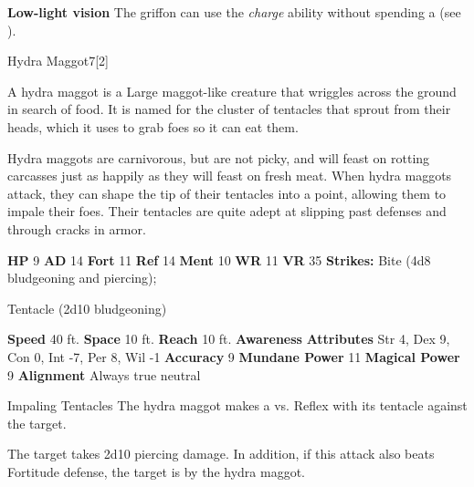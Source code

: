       
      \par\noindent\textbf{Low-light vision}
      The griffon can use the \textit{charge} ability without spending a  (see ).
  
  \begin{monsection}{Hydra Maggot}{7}[2]
    \vspace{-1em}\vspace{-1em}
    \vspace{0em}

    
        A hydra maggot is a Large maggot-like creature that wriggles across the ground in search of food.
        It is named for the cluster of tentacles that sprout from their heads, which it uses to grab foes so it can eat them.
      
        Hydra maggots are carnivorous, but are not picky, and will feast on rotting carcasses just as happily as they will feast on fresh meat.
        When hydra maggots attack, they can shape the tip of their tentacles into a point, allowing them to impale their foes.
        Their tentacles are quite adept at slipping past defenses and through cracks in armor.
      

    \begin{spellcontent}
      \begin{spelltargetinginfo}
        \pari \textbf{HP} 9 \monsep
          \textbf{AD} 14 \monsep
          \textbf{Fort} 11 \monsep
          \textbf{Ref} 14 \monsep
          \textbf{Ment} 10
        \pari \textbf{WR} 11 \monsep
        \textbf{VR} 35
        \pari \textbf{Strikes:}
            Bite  (4d8 bludgeoning and piercing);
\par Tentacle  (2d10 bludgeoning)
      \end{spelltargetinginfo}
    \end{spellcontent}
    \begin{monsterfooter}
      \pari \textbf{Speed} 40 ft. \monsep
        \textbf{Space} 10 ft. \monsep
        \textbf{Reach} 10 ft.
      \pari \textbf{Awareness} 
      \pari \textbf{Attributes}
        Str 4, Dex 9,
        Con 0, Int -7,
        Per 8, Wil -1
      \pari \textbf{Accuracy} 9 \monsep
        \textbf{Mundane Power} 11 \monsep
      \textbf{Magical Power} 9
      \pari \textbf{Alignment} Always true neutral
    \end{monsterfooter}
  \end{monsection}
  \begin{freeability}{Impaling Tentacles}
       The hydra maggot makes a 
         vs. Reflex
        with its tentacle against the target.
    
    \hit 
          The target takes 2d10 piercing damage.
          In addition, if this attack also beats Fortitude defense, the target is  by the hydra maggot.
    \end{freeability}
  
